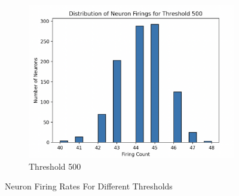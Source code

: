 \documentclass[a4paper,10pt]{article}
\begin{document}
\begin{figure}
\begin{subfigure}{0.4\textwidth}
    \includegraphics[width=\textwidth]{img/bonus/threshold_500.png}
    \caption{Threshold 500}
\end{subfigure}
\hfill
        
\caption{Neuron Firing Rates For Different Thresholds}
\label{fig:bonus_threshold}
\end{figure}


\end{document}
